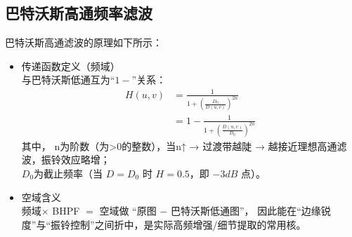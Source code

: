 \documentclass[11pt]{article}
\begin{document}
    \begin{center}
    \end{center}
    

\subsection{巴特沃斯高通频率滤波}
巴特沃斯高通滤波的原理如下所示：
\begin{itemize}
	\item 传递函数定义（频域）\\
	与巴特沃斯低通互为“$1 −$”关系：
	\begin{align*}
		H(u,v) &= \frac{1}{1 + (\frac{D_0}{D(u,v)})^{2n}}\\
		&=1-\frac{1}{1 + (\frac{D(u,v)}{D_0})^{2n}}
	\end{align*}
	其中，
	n为阶数（为>0的整数），当n↑ → 过渡带越陡 → 越接近理想高通滤波，振铃效应略增；\\
	$D_0$为截止频率（当 $D=D_0$ 时 $H=0.5$，即 $−3 dB$ 点）。
	\item 空域含义\\
	频域$\times$ BHPF $=$ 空域做 “原图 − 巴特沃斯低通图”，
	因此能在“边缘锐度”与“振铃控制”之间折中，是实际高频增强/细节提取的常用核。
\end{itemize}
\end{document}

